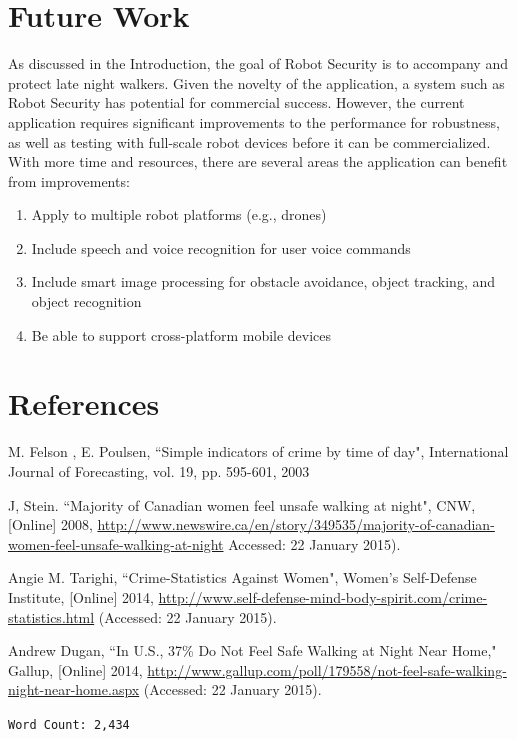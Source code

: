 \documentclass[12pt]{article}
\begin{document}
\section{Future Work}
As discussed in the Introduction, the goal of Robot Security is to accompany and protect late night walkers. Given the novelty of the application, a system such as Robot Security has potential for commercial success. However, the current application requires significant improvements to the performance for robustness, as well as testing with full-scale robot devices before it can be commercialized.
With more time and resources, there are several areas the application can benefit from improvements:
\begin{enumerate}
\item Apply to multiple robot platforms (e.g., drones)
\item Include speech and voice recognition for user voice commands
\item Include smart image processing for obstacle avoidance, object tracking, and object recognition
\item Be able to support cross-platform mobile devices
\end{enumerate}

\section*{References}
\begin{enumerate}
\begin{sloppypar}
\item M. Felson , E. Poulsen, ``Simple indicators of crime by time of day", International Journal of Forecasting, vol. 19, pp. 595-601, 2003
\item J, Stein. ``Majority of Canadian women feel unsafe walking at night", CNW, [Online] 2008, \url{http://www.newswire.ca/en/story/349535/majority-of-canadian-women-feel-unsafe-walking-at-night} Accessed:  22 January 2015).
\item Angie M. Tarighi, ``Crime-Statistics Against Women", Women’s Self-Defense Institute, [Online] 2014, \url{http://www.self-defense-mind-body-spirit.com/crime-statistics.html} (Accessed:  22 January 2015).
\item Andrew Dugan, ``In U.S., 37\% Do Not Feel Safe Walking at Night Near Home," Gallup, [Online] 2014, \url{http://www.gallup.com/poll/179558/not-feel-safe-walking-night-near-home.aspx} (Accessed:  22 January 2015).
\end{sloppypar}
\end{enumerate}

\begin{center}\texttt{\LARGE Word Count: 2,434}\end{center}
\end{document}
